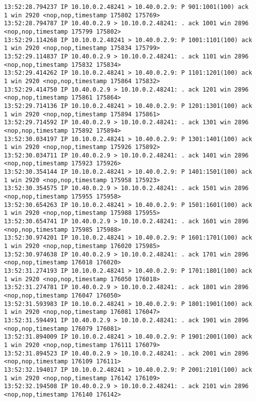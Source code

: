 \documentclass[a4paper,12pt]{article}
\begin{document}
\begin{lstlisting}
13:52:28.794237 IP 10.10.0.2.48241 > 10.40.0.2.9: P 901:1001(100) ack 1 win 2920 <nop,nop,timestamp 175802 175769>
13:52:28.794787 IP 10.40.0.2.9 > 10.10.0.2.48241: . ack 1001 win 2896 <nop,nop,timestamp 175799 175802>
13:52:29.114268 IP 10.10.0.2.48241 > 10.40.0.2.9: P 1001:1101(100) ack 1 win 2920 <nop,nop,timestamp 175834 175799>
13:52:29.114837 IP 10.40.0.2.9 > 10.10.0.2.48241: . ack 1101 win 2896 <nop,nop,timestamp 175832 175834>
13:52:29.414262 IP 10.10.0.2.48241 > 10.40.0.2.9: P 1101:1201(100) ack 1 win 2920 <nop,nop,timestamp 175864 175832>
13:52:29.414750 IP 10.40.0.2.9 > 10.10.0.2.48241: . ack 1201 win 2896 <nop,nop,timestamp 175861 175864>
13:52:29.714136 IP 10.10.0.2.48241 > 10.40.0.2.9: P 1201:1301(100) ack 1 win 2920 <nop,nop,timestamp 175894 175861>
13:52:29.714592 IP 10.40.0.2.9 > 10.10.0.2.48241: . ack 1301 win 2896 <nop,nop,timestamp 175892 175894>
13:52:30.034197 IP 10.10.0.2.48241 > 10.40.0.2.9: P 1301:1401(100) ack 1 win 2920 <nop,nop,timestamp 175926 175892>
13:52:30.034711 IP 10.40.0.2.9 > 10.10.0.2.48241: . ack 1401 win 2896 <nop,nop,timestamp 175923 175926>
13:52:30.354144 IP 10.10.0.2.48241 > 10.40.0.2.9: P 1401:1501(100) ack 1 win 2920 <nop,nop,timestamp 175958 175923>
13:52:30.354575 IP 10.40.0.2.9 > 10.10.0.2.48241: . ack 1501 win 2896 <nop,nop,timestamp 175955 175958>
13:52:30.654263 IP 10.10.0.2.48241 > 10.40.0.2.9: P 1501:1601(100) ack 1 win 2920 <nop,nop,timestamp 175988 175955>
13:52:30.654741 IP 10.40.0.2.9 > 10.10.0.2.48241: . ack 1601 win 2896 <nop,nop,timestamp 175985 175988>
13:52:30.974201 IP 10.10.0.2.48241 > 10.40.0.2.9: P 1601:1701(100) ack 1 win 2920 <nop,nop,timestamp 176020 175985>
13:52:30.974638 IP 10.40.0.2.9 > 10.10.0.2.48241: . ack 1701 win 2896 <nop,nop,timestamp 176018 176020>
13:52:31.274193 IP 10.10.0.2.48241 > 10.40.0.2.9: P 1701:1801(100) ack 1 win 2920 <nop,nop,timestamp 176050 176018>
13:52:31.274781 IP 10.40.0.2.9 > 10.10.0.2.48241: . ack 1801 win 2896 <nop,nop,timestamp 176047 176050>
13:52:31.593983 IP 10.10.0.2.48241 > 10.40.0.2.9: P 1801:1901(100) ack 1 win 2920 <nop,nop,timestamp 176081 176047>
13:52:31.594491 IP 10.40.0.2.9 > 10.10.0.2.48241: . ack 1901 win 2896 <nop,nop,timestamp 176079 176081>
13:52:31.894009 IP 10.10.0.2.48241 > 10.40.0.2.9: P 1901:2001(100) ack 1 win 2920 <nop,nop,timestamp 176111 176079>
13:52:31.894523 IP 10.40.0.2.9 > 10.10.0.2.48241: . ack 2001 win 2896 <nop,nop,timestamp 176109 176111>
13:52:32.194017 IP 10.10.0.2.48241 > 10.40.0.2.9: P 2001:2101(100) ack 1 win 2920 <nop,nop,timestamp 176142 176109>
13:52:32.194508 IP 10.40.0.2.9 > 10.10.0.2.48241: . ack 2101 win 2896 <nop,nop,timestamp 176140 176142>

\end{lstlisting}
\end{document}
